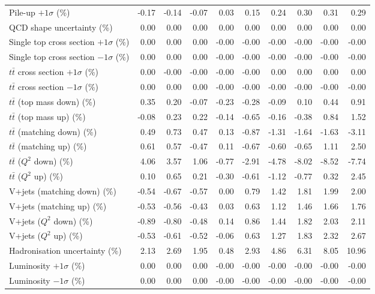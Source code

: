 \begin{table}[htbp]
{\begin{tabular}{lrrrrrrrrr}
Pile-up $+1\sigma$ (\%) & -0.17 & -0.14 & -0.07 & 0.03 & 0.15 & 0.24 & 0.30 & 0.31 & 0.29 \\ 
QCD shape uncertainty (\%) & 0.00 & 0.00 & 0.00 & 0.00 & 0.00 & 0.00 & 0.00 & 0.00 & 0.00 \\ 
Single top cross section $+1\sigma$ (\%) & 0.00 & 0.00 & 0.00 & -0.00 & -0.00 & -0.00 & -0.00 & -0.00 & -0.00 \\ 
Single top cross section $-1\sigma$ (\%) & 0.00 & 0.00 & 0.00 & -0.00 & -0.00 & -0.00 & -0.00 & -0.00 & -0.00 \\ 
$t\bar{t}$ cross section $+1\sigma$ (\%) & 0.00 & -0.00 & -0.00 & -0.00 & -0.00 & 0.00 & 0.00 & 0.00 & 0.00 \\ 
$t\bar{t}$ cross section $-1\sigma$ (\%) & 0.00 & 0.00 & 0.00 & -0.00 & -0.00 & -0.00 & -0.00 & -0.00 & -0.00 \\ 
$t\bar{t}$ (top mass down) (\%) & 0.35 & 0.20 & -0.07 & -0.23 & -0.28 & -0.09 & 0.10 & 0.44 & 0.91 \\ 
$t\bar{t}$ (top mass up) (\%) & -0.08 & 0.23 & 0.22 & -0.14 & -0.65 & -0.16 & -0.38 & 0.84 & 1.52 \\ 
$t\bar{t}$ (matching down) (\%) & 0.49 & 0.73 & 0.47 & 0.13 & -0.87 & -1.31 & -1.64 & -1.63 & -3.11 \\ 
$t\bar{t}$ (matching up) (\%) & 0.61 & 0.57 & -0.47 & 0.11 & -0.67 & -0.60 & -0.65 & 1.11 & 2.50 \\ 
$t\bar{t}$ ($Q^{2}$ down) (\%) & 4.06 & 3.57 & 1.06 & -0.77 & -2.91 & -4.78 & -8.02 & -8.52 & -7.74 \\ 
$t\bar{t}$ ($Q^{2}$ up) (\%) & 0.10 & 0.65 & 0.21 & -0.30 & -0.61 & -1.12 & -0.77 & 0.32 & 2.45 \\ 
V+jets (matching down) (\%) & -0.54 & -0.67 & -0.57 & 0.00 & 0.79 & 1.42 & 1.81 & 1.99 & 2.00 \\ 
V+jets (matching up) (\%) & -0.53 & -0.56 & -0.43 & 0.03 & 0.63 & 1.12 & 1.46 & 1.66 & 1.76 \\ 
V+jets ($Q^{2}$ down) (\%) & -0.89 & -0.80 & -0.48 & 0.14 & 0.86 & 1.44 & 1.82 & 2.03 & 2.11 \\ 
V+jets ($Q^{2}$ up) (\%) & -0.53 & -0.61 & -0.52 & -0.06 & 0.63 & 1.27 & 1.83 & 2.32 & 2.67 \\ 
Hadronisation uncertainty (\%) & 2.13 & 2.69 & 1.95 & 0.48 & 2.93 & 4.86 & 6.31 & 8.05 & 10.96 \\ 
Luminosity $+1\sigma$ (\%) & 0.00 & 0.00 & 0.00 & -0.00 & -0.00 & -0.00 & -0.00 & -0.00 & -0.00 \\ 
Luminosity $-1\sigma$ (\%) & 0.00 & 0.00 & 0.00 & -0.00 & -0.00 & -0.00 & -0.00 & -0.00 & -0.00 \\ 

\end{tabular}}
\end{table}
